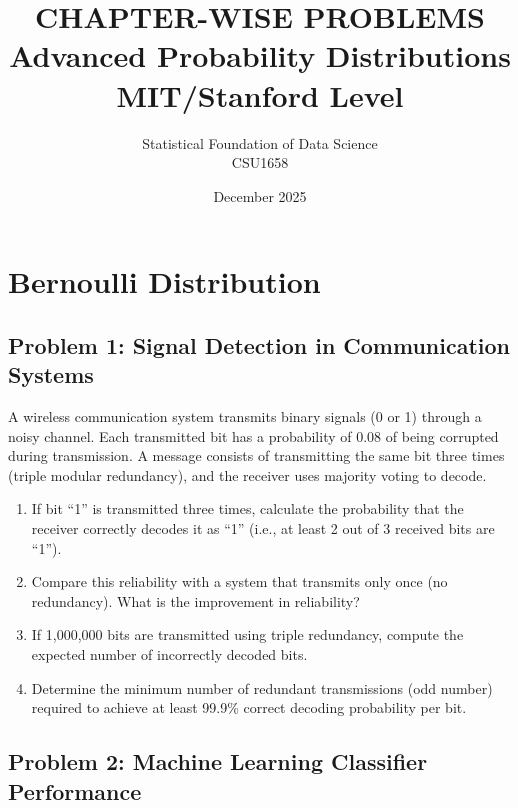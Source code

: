 \documentclass[12pt]{article}
\title{CHAPTER-WISE PROBLEMS\\
\large Advanced Probability Distributions\\
\small MIT/Stanford Level}
\author{Statistical Foundation of Data Science\\
CSU1658}
\date{December 2025}
\begin{document}
\maketitle

\tableofcontents
\newpage


\section{Bernoulli Distribution}

\subsection*{Problem 1: Signal Detection in Communication Systems}

A wireless communication system transmits binary signals (0 or 1) through a noisy channel. Each transmitted bit has a probability of 0.08 of being corrupted during transmission. A message consists of transmitting the same bit three times (triple modular redundancy), and the receiver uses majority voting to decode.

\begin{enumerate}[label=(\alph*)]
\item If bit ``1'' is transmitted three times, calculate the probability that the receiver correctly decodes it as ``1'' (i.e., at least 2 out of 3 received bits are ``1'').

\item Compare this reliability with a system that transmits only once (no redundancy). What is the improvement in reliability?

\item If 1,000,000 bits are transmitted using triple redundancy, compute the expected number of incorrectly decoded bits.

\item Determine the minimum number of redundant transmissions (odd number) required to achieve at least 99.9\% correct decoding probability per bit.
\end{enumerate}

\subsection*{Problem 2: Machine Learning Classifier Performance}
\end{document}
